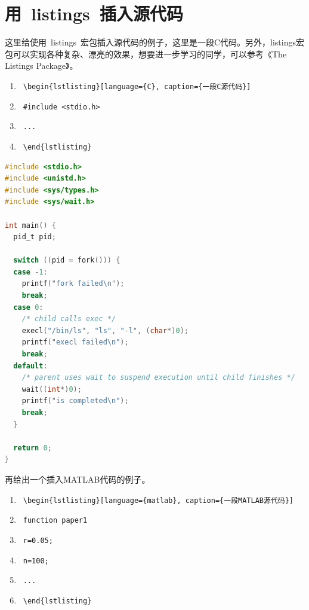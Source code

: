 \section{用~listings~插入源代码}

这里给使用~listings~宏包插入源代码的例子，这里是一段C代码。另外，listings宏包可以实现各种复杂、漂亮的效果，想要进一步学习的同学，可以参考《The Listings Package》。

{\color{blue}
\begin{enumerate}
\item[] ~\verb|\begin{lstlisting}[language={C}, caption={一段C源代码}]|
\item[] ~\verb|#include <stdio.h>|
\item[] ~\verb|...|
\item[] ~\verb|\end{lstlisting}|
\end{enumerate}}


\begin{lstlisting}[language={C}, caption={一段C源代码}]
#include <stdio.h>
#include <unistd.h>
#include <sys/types.h>
#include <sys/wait.h>

int main() {
  pid_t pid;

  switch ((pid = fork())) {
  case -1:
    printf("fork failed\n");
    break;
  case 0:
    /* child calls exec */
    execl("/bin/ls", "ls", "-l", (char*)0);
    printf("execl failed\n");
    break;
  default:
    /* parent uses wait to suspend execution until child finishes */
    wait((int*)0);
    printf("is completed\n");
    break;
  }

  return 0;
}
\end{lstlisting}

再给出一个插入MATLAB代码的例子。

{\color{blue}
\begin{enumerate}
\item[] ~\verb|\begin{lstlisting}[language={matlab}, caption={一段MATLAB源代码}]|
\item[] ~\verb|function paper1|
\item[] ~\verb|r=0.05;|
\item[] ~\verb|n=100;|
\item[] ~\verb|...|
\item[] ~\verb|\end{lstlisting}|
\end{enumerate}}

